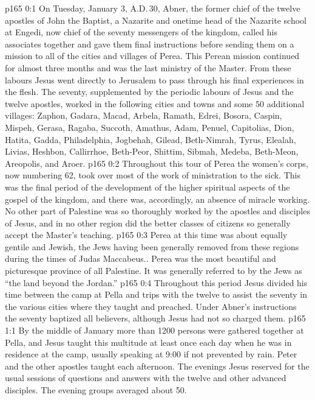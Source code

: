 \author{Midwayer Commission}
\vs p165 0:1 On Tuesday, January 3, A.D.\,30, Abner, the former chief of the twelve apostles of John the Baptist, a Nazarite and onetime head of the Nazarite school at Engedi, now chief of the seventy messengers of the kingdom, called his associates together and gave them final instructions before sending them on a mission to all of the cities and villages of Perea. This Perean mission continued for almost three months and was the last ministry of the Master. From these labours Jesus went directly to Jerusalem to pass through his final experiences in the flesh. The seventy, supplemented by the periodic labours of Jesus and the twelve apostles, worked in the following cities and towns and some 50 additional villages: Zaphon, Gadara, Macad, Arbela, Ramath, Edrei, Bosora, Caspin, Mispeh, Gerasa, Ragaba, Succoth, Amathus, Adam, Penuel, Capitolias, Dion, Hatita, Gadda, Philadelphia, Jogbehah, Gilead, Beth\hyp{}Nimrah, Tyrus, Elealah, Livias, Heshbon, Callirrhoe, Beth\hyp{}Peor, Shittim, Sibmah, Medeba, Beth\hyp{}Meon, Areopolis, and Aroer.
\vs p165 0:2 Throughout this tour of Perea the women’s corps, now numbering 62, took over most of the work of ministration to the sick. This was the final period of the development of the higher spiritual aspects of the gospel of the kingdom, and there was, accordingly, an absence of miracle working. No other part of Palestine was so thoroughly worked by the apostles and disciples of Jesus, and in no other region did the better classes of citizens so generally accept the Master’s teaching.
\vs p165 0:3 Perea at this time was about equally gentile and Jewish, the Jews having been generally removed from these regions during the times of Judas Maccabeus.. Perea was the most beautiful and picturesque province of all Palestine. It was generally referred to by the Jews as “the land beyond the Jordan.”
\vs p165 0:4 Throughout this period Jesus divided his time between the camp at Pella and trips with the twelve to assist the seventy in the various cities where they taught and preached. Under Abner’s instructions the seventy baptized all believers, although Jesus had not so charged them.
\vs p165 1:1 By the middle of January more than 1200 persons were gathered together at Pella, and Jesus taught this multitude at least once each day when he was in residence at the camp, usually speaking at 9:00 if not prevented by rain. Peter and the other apostles taught each afternoon. The evenings Jesus reserved for the usual sessions of questions and answers with the twelve and other advanced disciples. The evening groups averaged about 50.
